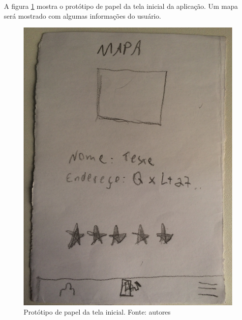 A figura \ref{img:prototipo_de_papel_tela_incial} mostra o protótipo de papel da tela inicial da aplicação. Um mapa será mostrado com algumas informações do usuário.
\begin{figure}[H]
    \centering
    \includegraphics[scale=0.1, angle=-90]{figuras/prototipo_papel_inicial.jpg}
    \caption[Protótipo de papel da tela inicial]{Protótipo de papel da tela inicial. Fonte: autores}
    \label{img:prototipo_de_papel_tela_incial}
\end{figure}
 \pagebreak

